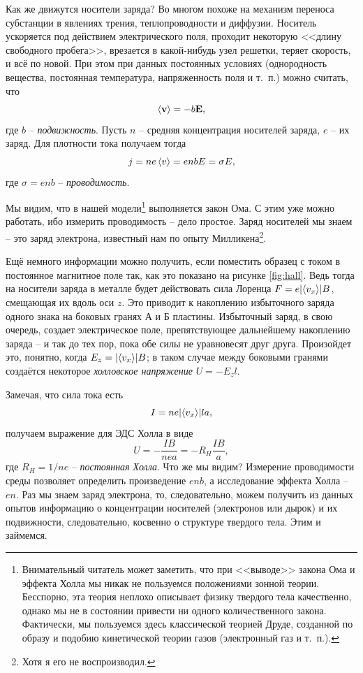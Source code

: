 \documentclass{../lab_class}
\begin{document}
Как же движутся носители заряда? Во многом похоже на механизм переноса субстанции в явлениях трения, теплопроводности и диффузии. Носитель ускоряется под действием электрического поля, проходит некоторую <<длину свободного пробега>>, врезается в какой-нибудь узел решетки, теряет скорость, и всё по новой. При этом при данных постоянных условиях (однородность вещества, постоянная температура, напряженность поля и т.~п.) можно считать, что
\begin{equation*}
	\left< \vb{v} \right> = -b \vb{E},
\end{equation*}
где $b$ -- \emph{подвижность}. Пусть $n$ -- средняя концентрация носителей заряда, $e$ -- их заряд. Для плотности тока получаем тогда
\begin{equation*}
	j = n e \left< v \right> = e n b E = \sigma E,
\end{equation*}
где $\sigma = e n b$ -- \emph{проводимость}. 

Мы видим, что в нашей модели\footnote{Внимательный читатель может заметить, что при <<выводе>> закона Ома и эффекта Холла мы никак не пользуемся положениями зонной теории. Бесспорно, эта теория неплохо описывает физику твердого тела качественно, однако мы не в состоянии привести ни одного количественного закона. Фактически, мы пользуемся здесь классической теорией Друде, созданной по образу и подобию кинетической теории газов (электронный газ и т.~п.).} выполняется закон Ома. С этим уже можно работать, ибо измерить проводимость -- дело простое. Заряд носителей мы знаем -- это заряд электрона, известный нам по опыту Милликена\footnote{Хотя я его не воспроизводил.}.

Ещё немного информации можно получить, если поместить образец с током в постоянное магнитное поле так, как это показано на рисунке \ref{fig:hall}. Ведь тогда на носители заряда в металле будет действовать сила Лоренца $F = e \abs{\left< v_x \right>} B$, смещающая их вдоль оси $z$. Это приводит к накоплению избыточного заряда одного знака на боковых гранях А и Б пластины. Избыточный заряд, в свою очередь, создает электрическое поле, препятствующее дальнейшему накоплению заряда -- и так до тех пор, пока обе силы не уравновесят друг друга. Произойдет это, понятно, когда $E_z = \abs{\left< v_x \right>} B$; в таком случае между боковыми гранями создаётся некоторое \emph{холловское напряжение} $U = -E_z l$.

\pagebreak

Замечая, что сила тока есть
\begin{equation*}
	I = n e \abs{\left< v_x \right>} l a,
\end{equation*}
получаем выражение для ЭДС Холла в виде
\begin{equation}\label{eq:hall_voltage}
	U = - \frac{IB}{nea} = -R_H \frac{IB}{a},
\end{equation}
где $R_H = 1/ne$ -- \emph{постоянная Холла}. Что же мы видим? Измерение проводимости среды позволяет определить произведение $enb$, а исследование эффекта Холла -- $en$. Раз мы знаем заряд электрона, то, следовательно, можем получить из данных опытов информацию о концентрации носителей (электронов или дырок) и их подвижности, следовательно, косвенно о структуре твердого тела. Этим и займемся.
\end{document}
